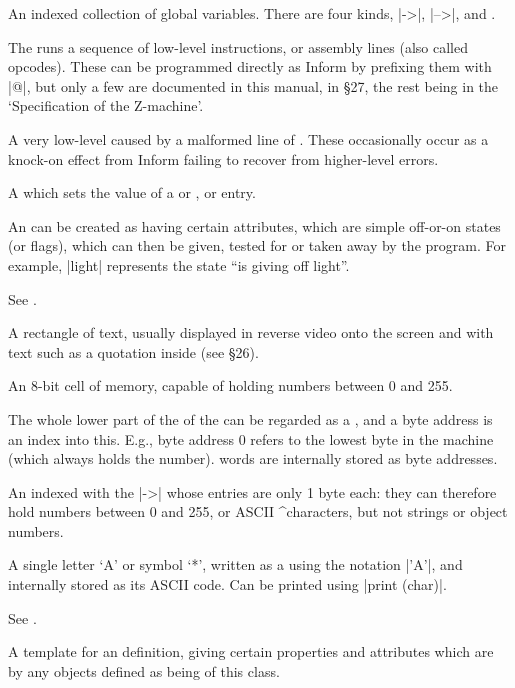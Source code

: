 {{{%
An indexed collection of global variables.  There are four kinds,
 |->|,  |-->|,  and
.

%
The  runs a sequence of low-level instructions,
or assembly lines (also called opcodes).  These can be programmed
directly as Inform  by prefixing them with |@|, but
only a few are documented in this manual, in \S 27, the rest
being in the `Specification of the Z-machine'.

%
A very low-level  caused by a malformed line of
.  These occasionally occur as a knock-on
effect from Inform failing to recover from higher-level errors.

%
A  which sets the value of a  or , or  entry.

%
An  can be created as having certain attributes, which
are simple off-or-on states (or flags), which can then be
given, tested for or taken away by the program.  For example,
|light| represents the state ``is giving off light''.

%
See .

%
A rectangle of text, usually displayed in reverse video onto the
screen and with text such as a quotation inside (see \S 26).

%
An 8-bit cell of memory, capable of holding numbers between 0
and 255.

%
The whole lower part of the  of the 
can be regarded as a , and a byte address is an
index into this.  E.g., byte address 0 refers to the lowest byte
in the machine (which always holds the  number).
 words are internally stored as byte addresses.

%
An  indexed with the |->|  whose entries are
only 1 byte each: they can therefore hold numbers between 0 and 255,
or ASCII ^{characters}, but not strings or object numbers.

%
A single letter `A' or symbol `*', written as a  using
the notation |'A'|, and internally stored as its ASCII code.  Can
be printed using |print (char)|.

%
See .

%
A template for an  definition, giving certain properties
and attributes which are  by any objects defined as
being of this class.

}}}
